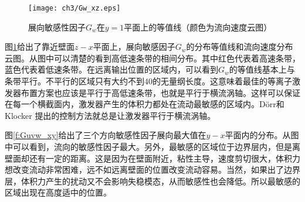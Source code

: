 \begin{figure}[htb]
  \centering
  \texttt{[image: ch3/Gw\_xz.eps]}\\
  \caption{展向敏感性因子$G_w$在$y=1$平面上的等值线（颜色为流向速度云图）}\label{f:Gw_xz}
\end{figure}

图\ref{f:Gw_xz}给出了靠近壁面$z-x$平面上，展向敏感因子$G_w$的分布等值线和流向速度分布云图。从图中可以清楚的看到高低速条带的相间分布。其中红色代表着高速条带，蓝色代表着低速条带。在远离输出位置的区域内，可以看到$G_w$的等值线基本上与条带平行。不平行的区域只有大约不到40的无量纲长度。这意味着最佳的等离子激发器布置方案也应该是平行于高低速条带，也就是平行于横流涡轴。这样可以保证在每一个横截面内，激发器产生的体积力都处在流动最敏感的区域内。D\"orr和Klocker \cite{dorr2015stabilisation,dorr2016}提出的控制方法就总是让激发器平行于横流涡轴。

图\ref{f:Guvw_xy}给出了三个方向敏感性因子展向最大值在$y-x$平面内的分布。从图中可以看到，流向的敏感性因子最大。另外，最敏感的区域位于边界层内，但是离壁面却还有一定的距离。这是因为在壁面附近，粘性主导，速度剪切很大，体积力想改变流动非常困难，远不如远离壁面的位置改变流动容易。当然，如果出了边界层，体积力产生的扰动又不会影响失稳模态，从而敏感性也会降低。所以最敏感的区域出现在高度适中的位置。

